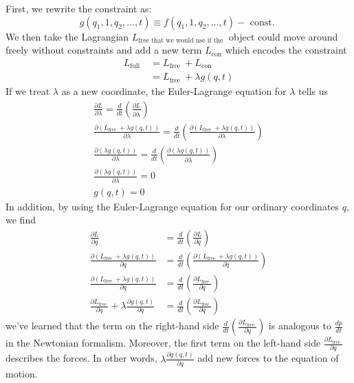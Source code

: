 \begin{mybox2}
First, we rewrite the constraint as:
$$
g\left(q_{1}, 1, q_{2}, \ldots, t\right) \equiv f\left(q_{1}, 1, q_{2}, \ldots, t\right)-\text { const. }
$$
We then take the Lagrangian $L_{\text {free that we would use if the }}$ object could move around freely without constraints and add a new term $L_{\text {con}}$  which encodes the constraint 
$$
\begin{aligned}
L_{\text {full }} &=L_{\text {free }}+L_{\text {con }} \\
&=L_{\text {free }}+\lambda g(q, t)
\end{aligned}
$$
If we treat $\lambda$ as a new coordinate, the Euler-Lagrange equation for $\lambda$ tells us
$$
\begin{array}{c}
{\frac{\partial L}{\partial \lambda}=\frac{d}{d t}\left(\frac{\partial L}{\partial \dot{\lambda}}\right)} \\
{\frac{\partial\left(L_{\text {free }}+\lambda g(q, t)\right)}{\partial \lambda}=\frac{d}{d t}\left(\frac{\partial\left(L_{\text {free }}+\lambda g(q, t)\right)}{\partial \lambda}\right)} \\
{\frac{\partial(\lambda g(q, t))}{\partial \lambda}=\frac{d}{d t}\left(\frac{\partial(\lambda g(q, t))}{\partial \dot{\lambda}}\right)} \\
{\frac{\partial(\lambda g(q, t))}{\partial \lambda}=0} \\
{g(q, t)=0}
\end{array}
$$
In addition, by using the Euler-Lagrange equation for our ordinary coordinates $q,$ we find
$$
\begin{aligned}
\frac{\partial L}{\partial q} &=\frac{d}{d t}\left(\frac{\partial L}{\partial \dot{q}}\right) \\
\frac{\partial\left(L_{\text {free }}+\lambda g(q, t)\right)}{\partial q} &=\frac{d}{d t}\left(\frac{\partial\left(L_{\text {free }}+\lambda g(q, t)\right)}{\partial \dot{q}}\right) \\
\frac{\partial\left(L_{\text {free }}+\lambda g(q, t)\right)}{\partial q} &=\frac{d}{d t}\left(\frac{\partial L_{\text {free }}}{\partial \dot{q}}\right) \\
\frac{\partial L_{\text {free }}}{\partial q}+\lambda \frac{\partial g(q, t)}{\partial q} &=\frac{d}{d t}\left(\frac{\partial L_{\text {free }}}{\partial \dot{q}}\right)
\end{aligned}
$$
we've learned that the term on the right-hand side $\frac{d}{d t}\left(\frac{\partial L_{\text {free }}}{\partial q}\right)$ is analogous to $\frac{d p}{d t}$ in the Newtonian formalism. Moreover, the first term on the left-hand side $\frac{\partial L_{\text {free }}}{\partial q}$ describes the forces. In other words, $\lambda \frac{\partial g(q, t)}{\partial q}$ add new forces to the equation of motion.
\end{mybox2}
